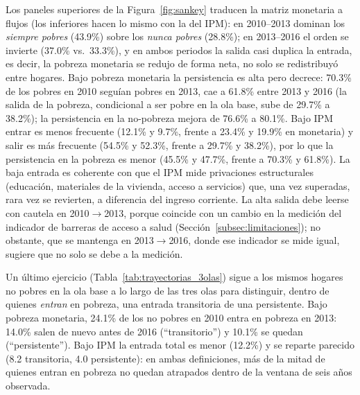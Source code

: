\documentclass[12pt, letterpaper]{article}
\begin{document}
Los paneles
superiores de la Figura~\ref{fig:sankey} traducen la matriz monetaria a
flujos (los inferiores hacen lo mismo con la del IPM): en 2010--2013 dominan los \emph{siempre
pobres} (43.9\%) sobre los \emph{nunca pobres} (28.8\%); en 2013--2016 el
orden se invierte (37.0\% vs.\ 33.3\%), y en ambos periodos la salida
casi duplica la entrada, es decir, la pobreza monetaria se redujo de forma neta,
no solo se redistribuyó entre hogares. Bajo pobreza monetaria la persistencia 
es alta pero decrece: 70.3\% de los
pobres en 2010 seguían pobres en 2013, cae a 61.8\% entre 2013 y 2016 (la
salida de la pobreza, condicional a ser pobre en la ola base, sube de
29.7\% a 38.2\%); la persistencia en la
no-pobreza mejora de 76.6\% a 80.1\%. Bajo IPM entrar es menos frecuente
(12.1\% y 9.7\%, frente a 23.4\% y 19.9\% en monetaria) y salir es más
frecuente (54.5\% y 52.3\%, frente a 29.7\% y 38.2\%), por lo que la
persistencia en la pobreza es menor (45.5\% y 47.7\%, frente a 70.3\% y
61.8\%). La baja entrada es coherente con que el IPM mide privaciones
estructurales (educación, materiales de la vivienda, acceso a servicios)
que, una vez superadas, rara vez se revierten, a diferencia del ingreso
corriente. La alta salida debe leerse con cautela en 2010$\to$2013,
porque coincide con un cambio en la medición del indicador de barreras de
acceso a salud (Sección~\ref{subsec:limitaciones}); no obstante, que se mantenga en
2013$\to$2016, donde ese indicador se mide igual, sugiere que no solo
se debe a la medición.

Un último ejercicio (Tabla~\ref{tab:trayectorias_3olas}) sigue a los
mismos hogares no pobres en la ola base a lo largo de las tres olas para
distinguir, dentro de quienes \emph{entran} en pobreza, una entrada
transitoria de una persistente. Bajo pobreza monetaria, 24.1\% de los no
pobres en 2010 entra en pobreza en 2013: 14.0\% salen de
nuevo antes de 2016 (``transitorio'') y 10.1\% se quedan (``persistente'').
Bajo IPM la entrada total es menor (12.2\%) y se reparte parecido (8.2
transitoria, 4.0 persistente): en ambas definiciones, más de la mitad de
quienes entran en pobreza no quedan atrapados dentro de la ventana de
seis años observada.



\end{document}
